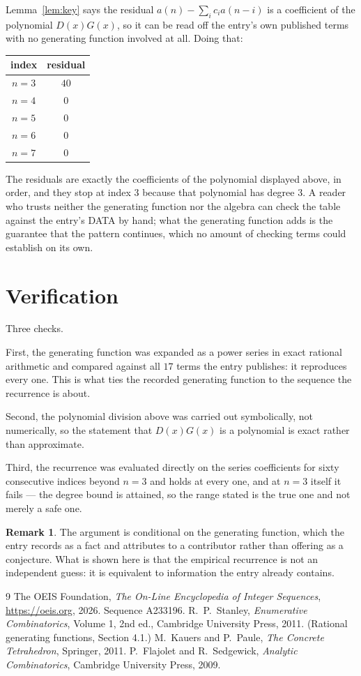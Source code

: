 \documentclass[11pt,a4paper]{article}
\theoremstyle{plain}
\theoremstyle{definition}
\newtheorem{remark}[theorem]{Remark}
\begin{document}
Lemma~\ref{lem:key} says the residual $a(n)-\sum_ic_ia(n-i)$ is a coefficient of the
polynomial $D(x)G(x)$, so it can be read off the entry's own published terms with no
generating function involved at all. Doing that:
\begin{center}
\begin{tabular}{cc}
index & residual \\ \hline
$n=3$ & $40$ \\
$n=4$ & $0$ \\
$n=5$ & $0$ \\
$n=6$ & $0$ \\
$n=7$ & $0$
\end{tabular}
\end{center}
The residuals are exactly the coefficients of the polynomial displayed above, in order, and
they stop at index $3$ because that polynomial has degree $3$. A reader who trusts
neither the generating function nor the algebra can check the table against the entry's DATA
by hand; what the generating function adds is the guarantee that the pattern continues, which
no amount of checking terms could establish on its own.

\section{Verification}

Three checks.

First, the generating function was expanded as a power series in exact rational arithmetic and
compared against all $17$ terms the entry publishes: it reproduces every one. This is
what ties the recorded generating function to the sequence the recurrence is about.

Second, the polynomial division above was carried out symbolically, not numerically, so the
statement that $D(x)G(x)$ is a polynomial is exact rather than approximate.

Third, the recurrence was evaluated directly on the series coefficients for sixty consecutive
indices beyond $n=3$ and holds at every one, and at $n=3$ itself it fails --- the
degree bound is attained, so the range stated is the true one and not merely a safe one.

\begin{remark}
The argument is conditional on the generating function, which the entry records as a fact and
attributes to a contributor rather than offering as a conjecture. What is shown here is that
the empirical recurrence is not an independent guess: it is equivalent to information the
entry already contains.
\end{remark}

\begin{thebibliography}{9}
 The OEIS Foundation, \emph{The On-Line Encyclopedia of Integer
Sequences}, \url{https://oeis.org}, 2026. Sequence A233196.
 R.~P.~Stanley, \emph{Enumerative Combinatorics}, Volume 1, 2nd ed.,
Cambridge University Press, 2011. (Rational generating functions, Section 4.1.)
 M.~Kauers and P.~Paule, \emph{The Concrete Tetrahedron}, Springer, 2011.
 P.~Flajolet and R.~Sedgewick, \emph{Analytic Combinatorics}, Cambridge
University Press, 2009.
\end{thebibliography}
\end{document}
